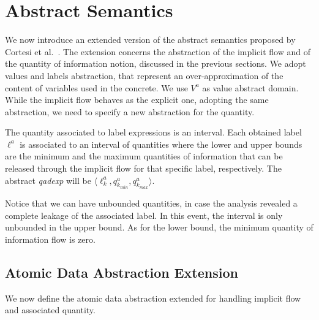 \documentclass{llncs}
\begin{document}
\section{Abstract Semantics}

\noindent We now introduce an extended version of the abstract semantics proposed by Cortesi et al.~\cite{Cortesi15}. The extension concerns the abstraction of the implicit flow and of the quantity of information notion, discussed in the previous sections. We adopt values and labels abstraction, that represent an over-approximation of the content of variables used in the concrete. We use $V^a$ as value abstract domain. While the implicit flow behaves as the explicit one, adopting the same abstraction, we need to specify a new abstraction for the quantity. 

\begin{definition}\label{quant_abs}
The quantity associated to label expressions is an interval. Each obtained label $\ell^a$ is associated to an interval of quantities where the lower and upper bounds are the minimum and the maximum quantities of information that can be released through the implicit flow for that specific label, respectively. The abstract \emph{qadexp} will be $\langle \ell^a_k, q^a_{k_{min}}, q^a_{k_{max}} \rangle$.
\end{definition}

\noindent Notice that we can have unbounded quantities, in case the analysis revealed a complete leakage of the associated label. In this event, the interval is only unbounded in the upper bound. As for the lower bound, the minimum quantity of information flow is zero.

\subsection{Atomic Data Abstraction Extension}
We now define the atomic data abstraction extended for handling implicit flow and associated quantity. 
\end{document}
